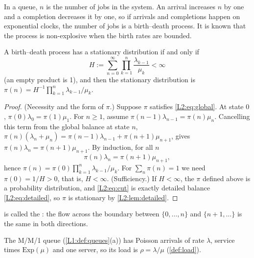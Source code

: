 In a queue, $n$ is the number of jobs in the system. An arrival increases $n$ by one
and a completion decreases it by one, so if arrivals and completions happen on
exponential clocks, the number of jobs is a birth--death process. It is known that
the process is non-explosive when the birth rates are bounded.

\begin{theorem}\label{thm:birthdeath}
A birth--death process has a stationary distribution if and only if
\begin{equation}\label{L2:eq:bdsum}
  H:=\sum_{n=0}^{\infty}\prod_{k=1}^{n}\frac{\lambda_{k-1}}{\mu_k}<\infty
\end{equation}
(an empty product is 1), and then the stationary distribution is
$\pi(n)=H^{-1}\prod_{k=1}^{n}\lambda_{k-1}/\mu_k$.
\end{theorem}
\begin{proof}
(Necessity and the form of $\pi$.) Suppose $\pi$ satisfies \eqref{L2:eq:global}. At
state $0$, $\pi(0)\lambda_0=\pi(1)\mu_1$. For $n\ge1$, assume
$\pi(n-1)\lambda_{n-1}=\pi(n)\mu_n$. Cancelling this term from the global balance at
state $n$, $\pi(n)(\lambda_n+\mu_n)=\pi(n-1)\lambda_{n-1}+\pi(n+1)\mu_{n+1}$, gives
$\pi(n)\lambda_n=\pi(n+1)\mu_{n+1}$. By induction, for all $n$
\begin{equation}\label{L2:eq:cut}
  \pi(n)\lambda_n=\pi(n+1)\mu_{n+1},
\end{equation}
hence $\pi(n)=\pi(0)\prod_{k=1}^n\lambda_{k-1}/\mu_k$. For $\sum_n\pi(n)=1$ we need
$\pi(0)=1/H>0$, that is, $H<\infty$.
(Sufficiency.) If $H<\infty$, the $\pi$ defined above is a probability distribution,
and \eqref{L2:eq:cut} is exactly detailed balance \eqref{L2:eq:detailed}, so $\pi$ is
stationary by \cref{L2:lem:detailed}.
\end{proof}

 is called the : the flow across the boundary
between $\{0,\dots,n\}$ and $\{n+1,\dots\}$ is the same in both directions.

The M/M/1 queue (\cref{L1:def:queues}(a)) has Poisson arrivals of rate $\lambda$,
service times $\mathrm{Exp}(\mu)$ and one server, so its load is $\rho=\lambda/\mu$
(\cref{def:load}).

